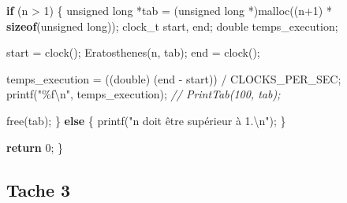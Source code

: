 \documentclass[
]{article}
\newenvironment{Shaded}{}{}
\newcommand{\CommentTok}[1]{\textcolor[rgb]{0.38,0.63,0.69}{\textit{#1}}}
\newcommand{\ControlFlowTok}[1]{\textcolor[rgb]{0.00,0.44,0.13}{\textbf{#1}}}
\newcommand{\DataTypeTok}[1]{\textcolor[rgb]{0.56,0.13,0.00}{#1}}
\newcommand{\DecValTok}[1]{\textcolor[rgb]{0.25,0.63,0.44}{#1}}
\newcommand{\KeywordTok}[1]{\textcolor[rgb]{0.00,0.44,0.13}{\textbf{#1}}}
\newcommand{\NormalTok}[1]{#1}
\newcommand{\SpecialCharTok}[1]{\textcolor[rgb]{0.25,0.44,0.63}{#1}}
\newcommand{\StringTok}[1]{\textcolor[rgb]{0.25,0.44,0.63}{#1}}
\begin{document}
\begin{Shaded}
\begin{Highlighting}[]
    \ControlFlowTok{if}\NormalTok{ (n \textgreater{} }\DecValTok{1}\NormalTok{) \{}
        \DataTypeTok{unsigned} \DataTypeTok{long}\NormalTok{ *tab = (}\DataTypeTok{unsigned} \DataTypeTok{long}\NormalTok{ *)malloc((n+}\DecValTok{1}\NormalTok{) * }\KeywordTok{sizeof}\NormalTok{(}\DataTypeTok{unsigned} \DataTypeTok{long}\NormalTok{));}
\NormalTok{        clock\_t start, end;}
        \DataTypeTok{double}\NormalTok{ temps\_execution;}

\NormalTok{        start = clock();}
\NormalTok{        Eratosthenes(n, tab);}
\NormalTok{        end = clock();}

\NormalTok{        temps\_execution = ((}\DataTypeTok{double}\NormalTok{) (end {-} start)) / CLOCKS\_PER\_SEC;}
\NormalTok{        printf(}\StringTok{"\%f}\SpecialCharTok{\textbackslash{}n}\StringTok{"}\NormalTok{, temps\_execution);}
        \CommentTok{// PrintTab(100, tab);}

\NormalTok{        free(tab);}
\NormalTok{    \} }\ControlFlowTok{else}\NormalTok{ \{}
\NormalTok{        printf(}\StringTok{"n doit être supérieur à 1.}\SpecialCharTok{\textbackslash{}n}\StringTok{"}\NormalTok{);}
\NormalTok{    \}}

    \ControlFlowTok{return} \DecValTok{0}\NormalTok{;}
\NormalTok{\}}
\end{Highlighting}
\end{Shaded}

\hypertarget{tache-3}{%
\subsection{Tache 3}\label{tache-3}}
\end{document}
